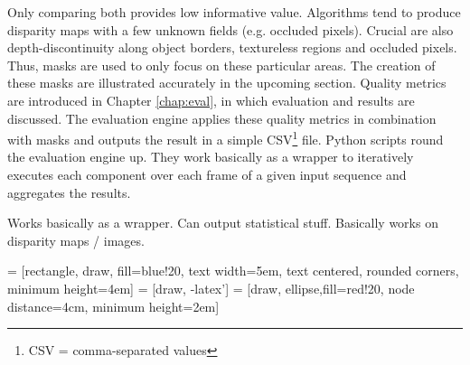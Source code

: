 Only comparing both provides low informative value.
Algorithms tend to produce disparity maps with a few unknown fields (e.g. occluded pixels).
Crucial are also depth-discontinuity along object borders, textureless regions and occluded pixels.
Thus, masks are used to only focus on these particular areas.
The creation of these masks are illustrated accurately in the upcoming section.
\newline\newline\noindent Quality metrics are introduced in Chapter \ref{chap:eval}, in which evaluation and results are discussed.
The evaluation engine applies these quality metrics in combination with masks and outputs the result in a simple CSV\footnote{CSV = comma-separated values} file.
\newline\newline\noindent Python scripts round the evaluation engine up.
They work basically as a wrapper to iteratively executes each component over each frame of a given input sequence and aggregates the results.



Works basically as a wrapper. Can output statistical stuff. Basically works on disparity maps / images.

 = [rectangle, draw, fill=blue!20,
    text width=5em, text centered, rounded corners, minimum height=4em]
 = [draw, -latex']
 = [draw, ellipse,fill=red!20, node distance=4cm,
    minimum height=2em]

\begin{center}
\end{center}

